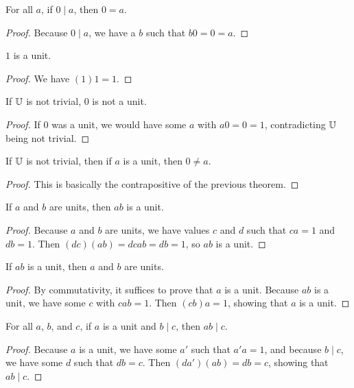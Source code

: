 \documentclass[../../math.tex]{subfiles}
\begin{document}
\begin{theorem} \label{div_zero}
    For all $a$, if $0 \mid a$, then $0 = a$.
\end{theorem}
\begin{proof}
    Because $0 \mid a$, we have a $b$ such that $b0 = 0 = a$.
\end{proof}

\begin{theorem} \label{one_unit}
    $1$ is a unit.
\end{theorem}
\begin{proof}
    We have $(1)1 = 1$.
\end{proof}

\begin{theorem} \label{zero_not_unit}
    If $\mathbb{U}$ is not trivial, $0$ is not a unit.
\end{theorem}
\begin{proof}
    If $0$ was a unit, we would have some $a$ with $a0 = 0 = 1$, contradicting
    $\mathbb{U}$ being not trivial.
\end{proof}

\begin{theorem} \label{unit_nz}
    If $\mathbb{U}$ is not trivial, then if $a$ is a unit, then $0 \neq a$.
\end{theorem}
\begin{proof}
    This is basically the contrapositive of the previous theorem.
\end{proof}

\begin{theorem} \label{unit_mult}
    If $a$ and $b$ are units, then $ab$ is a unit.
\end{theorem}
\begin{proof}
    Because $a$ and $b$ are units, we have values $c$ and $d$ such that $ca = 1$
    and $db = 1$.  Then $(dc)(ab) = dcab = db = 1$, so $ab$ is a unit.
\end{proof}

\begin{theorem} \label{lmult_unit} \label{rmult_unit}
    If $ab$ is a unit, then $a$ and $b$ are units.
\end{theorem}
\begin{proof}
    By commutativity, it suffices to prove that $a$ is a unit.  Because $ab$ is
    a unit, we have some $c$ with $cab = 1$.  Then $(cb)a = 1$, showing that $a$
    is a unit.
\end{proof}

\begin{theorem} \label{div_unit_mult}
    For all $a$, $b$, and $c$, if $a$ is a unit and $b \mid c$, then $ab \mid
    c$.
\end{theorem}
\begin{proof}
    Because $a$ is a unit, we have some $a'$ such that $a'a = 1$, and because $b
    \mid c$, we have some $d$ such that $db = c$.  Then $(da')(ab) = db = c$,
    showing that $ab \mid c$.
\end{proof}
\end{document}
